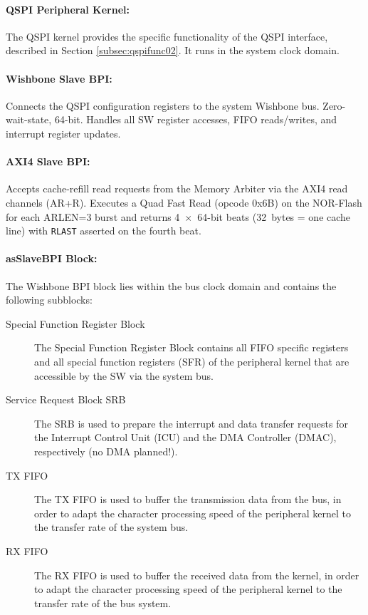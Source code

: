 \paragraph{QSPI Peripheral Kernel: } The QSPI kernel provides the specific functionality of the QSPI interface, described in Section \ref{subsec:qspifunc02}. It runs in the system clock domain.

\paragraph{Wishbone Slave BPI: } Connects the QSPI configuration registers to the system Wishbone bus. Zero-wait-state, 64-bit. Handles all SW register accesses, FIFO reads/writes, and interrupt register updates.

\paragraph{AXI4 Slave BPI: } Accepts cache-refill read requests from the Memory Arbiter via the AXI4 read channels (AR+R). Executes a Quad Fast Read (opcode 0x6B) on the NOR-Flash for each ARLEN=3 burst and returns 4~$\times$~64-bit beats (32~bytes = one cache line) with \texttt{RLAST} asserted on the fourth beat.

\paragraph{asSlaveBPI Block: } The Wishbone BPI block lies within the bus clock domain and contains the following subblocks:
\begin{description}
  \item [Special Function Register Block] The Special Function Register Block contains all FIFO specific registers and all special function registers (SFR) of the peripheral kernel that are accessible by the SW via the system bus.
  \item [Service Request Block SRB] The SRB is used to prepare the interrupt and data transfer requests for the Interrupt Control Unit (ICU) and the DMA Controller (DMAC), respectively (no DMA planned!).
  \item [TX FIFO] The TX FIFO is used to buffer the transmission data from the bus, in order to adapt the character processing speed of the peripheral kernel to the transfer rate of the system bus.
  \item [RX FIFO] The RX FIFO is used to buffer the received data from the kernel, in order to adapt the character processing speed of the peripheral kernel to the transfer rate of the bus system.
\end{description}

